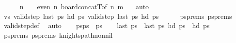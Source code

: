 \begin{isabellebody}
\ \ \ \ \isamarkupfalse%
\ {\isacartoucheopen}n\ {\isasymge}\ {}{}\ {\isasymand}\ even\ n{\isacartoucheclose}\ board{\isacharunderscore}{\kern0pt}concatT{\isacharbrackleft}{\kern0pt}of\ {\isachardoublequoteopen}n{\isacharminus}{\kern0pt}{}{\isachardoublequoteclose}\ m\ {}{\isacharbrackright}{\kern0pt}\ \isamarkupfalse%
\ auto\isanewline
\isanewline
\ \ \isamarkupfalse%
\ vs{\isacharcolon}{\kern0pt}\ {\isachardoublequoteopen}valid{\isacharunderscore}{\kern0pt}step\ {\isacharparenleft}{\kern0pt}last\ {\isacharquery}{\kern0pt}ps\ {\isacharparenleft}{\kern0pt}hd\ {\isacharquery}{\kern0pt}ps\ {\isachardoublequoteopen}valid{\isacharunderscore}{\kern0pt}step\ {\isacharparenleft}{\kern0pt}last\ {\isacharquery}{\kern0pt}ps\ {\isacharparenleft}{\kern0pt}hd\ {\isacharquery}{\kern0pt}ps\isanewline
\ \ \ \ \isamarkupfalse%
\ psprems\ psprems\ \isamarkupfalse%
\ valid{\isacharunderscore}{\kern0pt}step{\isacharunderscore}{\kern0pt}def\ \isamarkupfalse%
\ auto\isanewline
\isanewline
\ \ \isamarkupfalse%
\ {\isacharquery}{\kern0pt}ps{\isacharequal}{\kern0pt}{\isachardoublequoteopen}{\isacharquery}{\kern0pt}ps\ {\isacharat}{\kern0pt}\ {\isacharquery}{\kern0pt}ps\isanewline
\ \ \isamarkupfalse%
\ {\isachardoublequoteopen}last\ {\isacharquery}{\kern0pt}ps\ {\isacharequal}{\kern0pt}\ last\ {\isacharquery}{\kern0pt}ps\ {\isachardoublequoteopen}hd\ {\isacharquery}{\kern0pt}ps\ {\isacharequal}{\kern0pt}\ hd\ {\isacharquery}{\kern0pt}ps\isanewline
\ \ \ \ \isamarkupfalse%
\ psprems\ psprems\ knights{\isacharunderscore}{\kern0pt}path{\isacharunderscore}{\kern0pt}non{\isacharunderscore}{\kern0pt}nil\ \isamarkupfalse%

\end{isabellebody}
